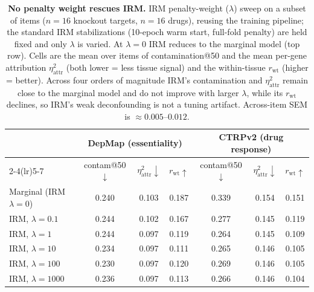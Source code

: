 \begin{table}[t]
  \centering
  \footnotesize
  \begin{tabular}{l ccc ccc}
    \toprule
    & \multicolumn{3}{c}{DepMap (essentiality)} & \multicolumn{3}{c}{CTRPv2 (drug response)} \\
    \cmidrule(lr){2-4}\cmidrule(lr){5-7}
    & contam@50$\downarrow$ & $\eta^2_{\mathrm{attr}}\downarrow$ & $r_{\mathrm{wt}}\uparrow$ & contam@50$\downarrow$ & $\eta^2_{\mathrm{attr}}\downarrow$ & $r_{\mathrm{wt}}\uparrow$ \\
    \midrule
    Marginal (IRM $\lambda{=}0$) & 0.240 & 0.103 & 0.187 & 0.339 & 0.154 & 0.151 \\
    \midrule
    IRM, $\lambda=0.1$ & 0.244 & 0.102 & 0.167 & 0.277 & 0.145 & 0.119 \\
    IRM, $\lambda=1$ & 0.244 & 0.097 & 0.119 & 0.264 & 0.145 & 0.109 \\
    IRM, $\lambda=10$ & 0.234 & 0.097 & 0.111 & 0.265 & 0.146 & 0.105 \\
    IRM, $\lambda=100$ & 0.230 & 0.097 & 0.120 & 0.269 & 0.146 & 0.105 \\
    IRM, $\lambda=1000$ & 0.236 & 0.097 & 0.113 & 0.266 & 0.146 & 0.104 \\
    \bottomrule
  \end{tabular}
  \caption{\textbf{No penalty weight rescues IRM.} IRM penalty-weight ($\lambda$) sweep on a subset of items ($n=16$ knockout targets, $n=16$ drugs), reusing the training pipeline; the standard IRM stabilizations (10-epoch warm start, full-fold penalty) are held fixed and only $\lambda$ is varied. At $\lambda=0$ IRM reduces to the marginal model (top row). Cells are the mean over items of contamination@50 and the mean per-gene attribution $\eta^2_{\mathrm{attr}}$ (both lower = less tissue signal) and the within-tissue $r_{\mathrm{wt}}$ (higher = better). Across four orders of magnitude IRM's contamination and $\eta^2_{\mathrm{attr}}$ remain close to the marginal model and do not improve with larger $\lambda$, while its $r_{\mathrm{wt}}$ declines, so IRM's weak deconfounding is not a tuning artifact. Across-item SEM is $\approx 0.005$--$0.012$.}
  \label{tab:irm_sweep}
\end{table}
